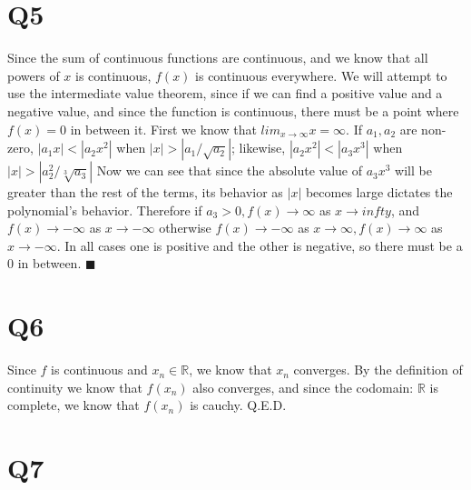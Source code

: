\documentclass[12pt]{article}
\newcommand{\R}{\mathbb{R}}
\begin{document}
\section{Q5}
Since the sum of continuous functions are continuous, and we know that all powers of $x$ is continuous, $f(x)$ is continuous everywhere.
\newline
We will attempt to use the intermediate value theorem, since if we can find a positive value and a negative value, and since the function is continuous, there must be a point where $f(x) =0$ in between it.
\newline
First we know that $lim _{x \to \infty} x = \infty$. If $a_1, a_2$ are non-zero, $|a_1x|<|a_2x^2|$ when $|x|>|a_1/\sqrt{a_2}|$; likewise, $|a_2x^2| < |a_3x^3|$ when $|x|>|a_2^2/\sqrt[3]{a_3}|$
\newline
Now we can see that since the absolute value of $a_3x^3$ will be greater than the rest of the terms, its behavior as $|x|$ becomes large dictates the polynomial's behavior.
\newline
Therefore if $a_3>0, f(x)\to \infty$ as $x \to infty$, and $f(x)\to -\infty$ as $x \to -\infty$ otherwise $f(x)\to -\infty$ as $x \to \infty, f(x) \to \infty$ as $x \to -\infty$. In all cases one is positive and the other is negative, so there must be a 0 in between.
\newline
$\blacksquare$
\newpage


\section{Q6}
Since $f$ is continuous and $x_n \in \R$, we know that $x_n$ converges. By the definition of continuity we know that $f(x_n)$ also converges, and since the codomain: $\R$ is complete, we know that $f(x_n)$ is cauchy.
\newline
Q.E.D.
\newpage


\section{Q7}
\end{document}

